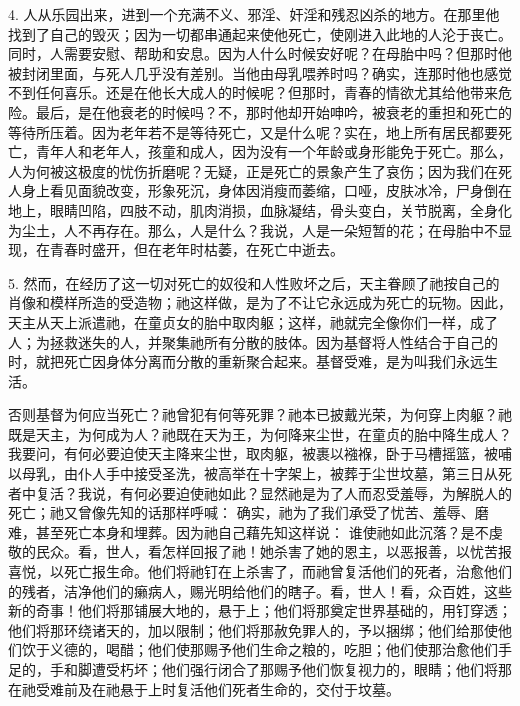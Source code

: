4. 人从乐园出来，进到一个充满不义、邪淫、奸淫和残忍凶杀的地方。在那里他找到了自己的毁灭；因为一切都串通起来使他死亡，使刚进入此地的人沦于丧亡。同时，人需要安慰、帮助和安息。因为人什么时候安好呢？在母胎中吗？但那时他被封闭里面，与死人几乎没有差别。当他由母乳喂养时吗？确实，连那时他也感觉不到任何喜乐。还是在他长大成人的时候呢？但那时，青春的情欲尤其给他带来危险。最后，是在他衰老的时候吗？不，那时他却开始呻吟，被衰老的重担和死亡的等待所压着。因为老年若不是等待死亡，又是什么呢？实在，地上所有居民都要死亡，青年人和老年人，孩童和成人，因为没有一个年龄或身形能免于死亡。那么，人为何被这极度的忧伤折磨呢？无疑，正是死亡的景象产生了哀伤；因为我们在死人身上看见面貌改变，形象死沉，身体因消瘦而萎缩，口哑，皮肤冰冷，尸身倒在地上，眼睛凹陷，四肢不动，肌肉消损，血脉凝结，骨头变白，关节脱离，全身化为尘土，人不再存在。那么，人是什么？我说，人是一朵短暂的花；在母胎中不显现，在青春时盛开，但在老年时枯萎，在死亡中逝去。\par

5. 然而，在经历了这一切对死亡的奴役和人性败坏之后，天主眷顾了祂按自己的肖像和模样所造的受造物；祂这样做，是为了不让它永远成为死亡的玩物。因此，天主从天上派遣祂，在童贞女的胎中取肉躯；这样，祂就完全像你们一样，成了人；为拯救迷失的人，并聚集祂所有分散的肢体。因为基督将人性结合于自己的时，就把死亡因身体分离而分散的重新聚合起来。基督受难，是为叫我们永远生活。\par

否则基督为何应当死亡？祂曾犯有何等死罪？祂本已披戴光荣，为何穿上肉躯？祂既是天主，为何成为人？祂既在天为王，为何降来尘世，在童贞的胎中降生成人？我要问，有何必要迫使天主降来尘世，取肉躯，被裹以襁褓，卧于马槽摇篮，被哺以母乳，由仆人手中接受圣洗，被高举在十字架上，被葬于尘世坟墓，第三日从死者中复活？我说，有何必要迫使祂如此？显然祂是为了人而忍受羞辱，为解脱人的死亡；祂又曾像先知的话那样呼喊： 确实，祂为了我们承受了忧苦、羞辱、磨难，甚至死亡本身和埋葬。因为祂自己藉先知这样说： 谁使祂如此沉落？是不虔敬的民众。看，世人，看怎样回报了祂！她杀害了她的恩主，以恶报善，以忧苦报喜悦，以死亡报生命。他们将祂钉在上杀害了，而祂曾复活他们的死者，治愈他们的残者，洁净他们的癞病人，赐光明给他们的瞎子。看，世人！看，众百姓，这些新的奇事！他们将那铺展大地的，悬于上；他们将那奠定世界基础的，用钉穿透；他们将那环绕诸天的，加以限制；他们将那赦免罪人的，予以捆绑；他们给那使他们饮于义德的，喝醋；他们使那赐予他们生命之粮的，吃胆；他们使那治愈他们手足的，手和脚遭受朽坏；他们强行闭合了那赐予他们恢复视力的，眼睛；他们将那在祂受难前及在祂悬于上时复活他们死者生命的，交付于坟墓。\par

